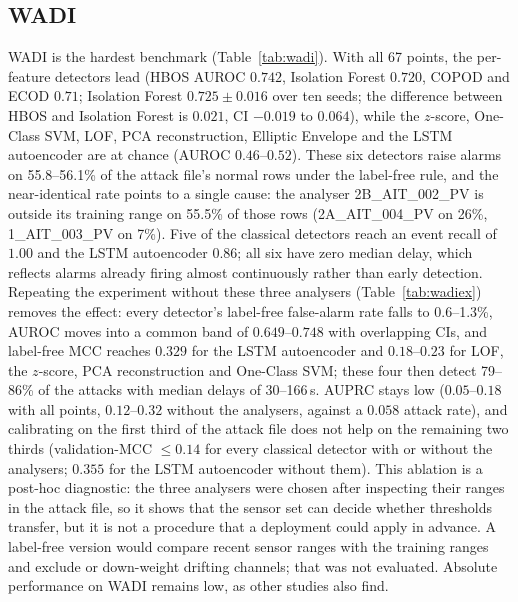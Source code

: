 \documentclass[11pt]{article}
\begin{document}
\subsection{WADI}
\label{sec:wadi}
WADI is the hardest benchmark (Table~\ref{tab:wadi}). With all 67 points, the
per-feature detectors lead (HBOS AUROC $0.742$, Isolation Forest $0.720$, COPOD and ECOD
$0.71$; Isolation Forest $0.725\pm0.016$ over ten seeds; the difference between HBOS and
Isolation Forest is $0.021$, CI $-0.019$ to $0.064$), while the $z$-score, One-Class
SVM, LOF, PCA reconstruction, Elliptic Envelope and the LSTM autoencoder are at chance
(AUROC $0.46$--$0.52$). These six detectors raise alarms on 55.8--56.1\% of the attack
file's normal rows under the label-free rule, and the near-identical rate points to a
single cause: the analyser 2B\_AIT\_002\_PV is outside its training range on 55.5\% of
those rows (2A\_AIT\_004\_PV on 26\%, 1\_AIT\_003\_PV on 7\%). Five of the classical detectors reach an event recall of $1.00$ and the LSTM autoencoder
$0.86$; all six have zero median delay, which reflects alarms already firing almost
continuously rather than early detection.
Repeating the experiment without these three analysers (Table~\ref{tab:wadiex}) removes the
effect: every detector's label-free false-alarm rate falls to 0.6--1.3\%, AUROC moves into a common band of $0.649$--$0.748$ with
overlapping CIs, and label-free MCC reaches $0.329$ for the LSTM autoencoder and
$0.18$--$0.23$ for LOF, the $z$-score, PCA reconstruction and One-Class SVM; these four
then detect 79--86\% of the attacks with median delays of 30--166\,s. AUPRC stays low
($0.05$--$0.18$ with all points, $0.12$--$0.32$ without the analysers, against a $0.058$
attack rate), and calibrating on the first third of the attack file does not help on the
remaining two thirds (validation-MCC $\le0.14$ for every classical detector with or
without the analysers; $0.355$ for the LSTM autoencoder without them). This
ablation is a post-hoc diagnostic: the three analysers were chosen after inspecting their
ranges in the attack file, so it shows that the sensor set can decide whether thresholds
transfer, but it is not a procedure that a deployment could apply in advance. A label-free
version would compare recent sensor ranges with the training ranges and exclude or
down-weight drifting channels; that was not evaluated. Absolute performance on WADI remains
low, as other studies also find.
\end{document}
